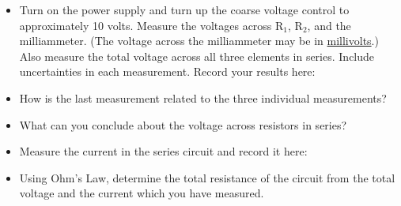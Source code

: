 \begin{itemize}

\item Turn on the power supply and turn up the coarse voltage control to 
approximately 10 volts. Measure the voltages across R\( _{1} \), R\( _{2} \), 
and the milliammeter. (The voltage across the milliammeter may be in \underline{millivolts}.) Also measure the total voltage across all three elements 
in series. Include uncertainties in each measurement. Record your results here:
\vspace{20mm}

\item How is the last measurement related to the three individual 
measurements?
\vspace{10mm}

\item What can you conclude about the voltage across resistors in series?
\vspace{10mm}

\item Measure the current in the series circuit and record it here:
\vspace{10mm}

\item Using Ohm's Law, determine the total resistance of the circuit from the 
total voltage and the current which you have measured.
\vspace{10mm}







\end{itemize}
